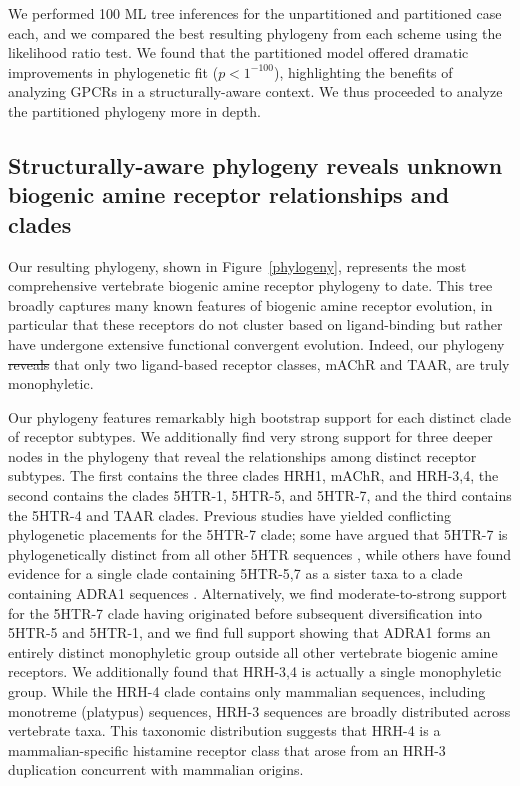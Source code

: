 \documentclass[fleqn,10pt]{wlpeerj}
\providecommand{\DIFaddtex}[1]{{\protect\color{blue}\uwave{#1}}} %
\providecommand{\DIFdeltex}[1]{{\protect\color{red}\sout{#1}}}                      %
\providecommand{\DIFaddbegin}{} %
\providecommand{\DIFaddend}{} %
\providecommand{\DIFdelbegin}{} %
\providecommand{\DIFdelend}{} %
\providecommand{\DIFadd}[1]{\texorpdfstring{\DIFaddtex{#1}}{#1}} %
\providecommand{\DIFdel}[1]{\texorpdfstring{\DIFdeltex{#1}}{}} %
\begin{document}
We performed 100 ML tree inferences for the unpartitioned and partitioned case each, and we compared the best resulting phylogeny from each scheme using the likelihood ratio test. We found that the partitioned model offered dramatic improvements in phylogenetic fit ($p < 1^{-100}$), highlighting the benefits of analyzing GPCRs in a structurally-aware context. We thus proceeded to analyze the partitioned phylogeny more in depth.


\subsection*{Structurally-aware phylogeny reveals unknown biogenic amine receptor relationships and clades}

Our resulting phylogeny, shown in Figure~\ref{phylogeny}, represents the most comprehensive vertebrate biogenic amine receptor phylogeny to date. This tree broadly captures many known features of biogenic amine receptor evolution, in particular that these receptors do not cluster based on ligand-binding but rather have undergone extensive functional convergent evolution. Indeed, our phylogeny \DIFdelbegin \DIFdel{reveals }\DIFdelend \DIFaddbegin \DIFadd{indicates }\DIFaddend that only two ligand-based receptor classes, mAChR and TAAR, are truly monophyletic. 

Our phylogeny features remarkably high bootstrap support for each distinct clade of receptor subtypes. We additionally find very strong support for three deeper nodes in the phylogeny that reveal the relationships among distinct receptor subtypes. The first contains the three clades HRH1, mAChR, and HRH-3,4, the second contains the clades 5HTR-1, 5HTR-5, and 5HTR-7, and the third contains the 5HTR-4 and TAAR clades. Previous studies have yielded conflicting phylogenetic placements for the 5HTR-7 clade; some have argued that 5HTR-7 is phylogenetically distinct from all other 5HTR sequences \citep{KakaralaJamil2014}, while others have found evidence for a single clade containing 5HTR-5,7 as a sister taxa to a clade containing ADRA1 sequences \citep{Fredrikssonetal2003}. Alternatively, we find moderate-to-strong support for the 5HTR-7 clade having originated before subsequent diversification into 5HTR-5 and 5HTR-1, and we find full support showing that ADRA1 forms an entirely distinct monophyletic group outside all other vertebrate biogenic amine receptors. We additionally found that HRH-3,4 is actually a single monophyletic group. While the HRH-4 clade contains only mammalian sequences, including monotreme (platypus) sequences, HRH-3 sequences are broadly distributed across vertebrate taxa. This taxonomic distribution suggests that HRH-4 is a mammalian-specific histamine receptor class that arose from an HRH-3 duplication concurrent with mammalian origins.
\end{document}
